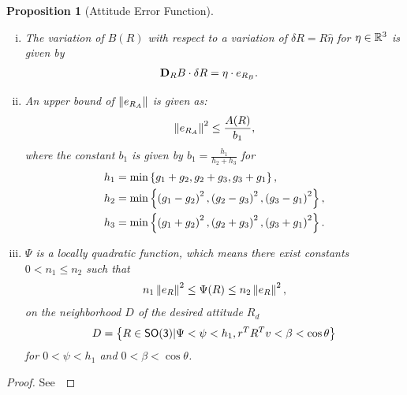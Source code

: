 \documentclass[10pt,fleqn]{IJCAS}  %
\newtheorem{prop}{Proposition}
\begin{document}
\begin{multicols}{2}
\begin{prop}[Attitude Error Function]
\begin{enumerate}[(i)]
	\begin{align}\label{eq:dirDiff_A}
		\dirDiff{A}{R} &= \eta \cdot e_{R_A} ,
	\end{align}
	where the notation \( \dirDiff{A}{R} \) represents the directional derivative of $A$ with respect to $R$ along $\delta R$.
	\item \label{item:prop_erb} The variation of \( B(R) \) with respect to a variation of \( \delta R = R \hat{\eta} \) for \( \eta \in \mathbb{R}^3 \) is given by
	\begin{align}\label{eq:dirDiff_B}
		\mathbf{D}_{R} B \cdot \delta R &= \eta \cdot e_{R_{B}}.
	\end{align}
	\item \label{item:prop_era_upbound}An upper bound of \( \left\| e_{R_A} \right\| \) is given as:
	\begin{align}
		\left\| e_{R_A} \right\|^2 \leq \frac{A(R)}{b_1} , \label{eqn:psi_lower_bound}
	\end{align}
	where the constant \( b_1 \) is given by \( b_1 = \frac{h_1}{h_2 + h_3} \) for 
	\begin{align*}
		h_1 &= \min\left\{ g_1 + g_2, g_2 + g_3 , g_3 + g_1 \right\} ,\\
		h_2 &= \min\left\{ \left( g_1 -g_2 \right)^2,\left( g_2 -g_3 \right)^2 , \left( g_3 -g_1 \right)^2 \right\} ,\\
		h_3 &= \min\left\{ \left( g_1 + g_2 \right)^2, \left( g_2 + g_3 \right)^2 , \left( g_3 + g_1 \right)^2 \right\}.		
	\end{align*}
    \item \label{item:prop_psi_quadratic} \( \Psi \) is a locally quadratic function, which means there exist constants \( 0 < n_1 \leq n_2 \) such that
    \begin{align}\label{eq:psi_bound}
        n_1 \left\| e_R \right\|^2 \leq \Psi(R) \leq n_2 \left\| e_R \right\|^2 ,
    \end{align}
    on the neighborhood $D$ of the desired attitude \( R_d \)
    \begin{align}\label{eq:psi_quadratic_domain}
        D = \left\{ R\in\mathsf{SO(3)}  \vert \Psi < \psi < h_1, r^T R^T v < \beta < \cos \theta \right\}
    \end{align}
    for $0<\psi < h_1 $ and $0< \beta<\cos\theta$. 
\end{enumerate}
\end{prop}
\begin{proof}
See~
\end{proof}


\end{multicols}
\end{document}

